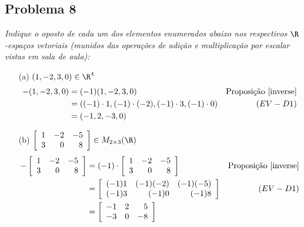 \subsection*{Problema 8}
  \textit{Indique  o oposto  de cada  um dos  elementos enumerados  abaixo nos
  respectivos $\R$-espaços vetoriais  (munidos das operações de adição
  e multiplicação por escalar vistas em sala de aula):}
\begin{itemize}
\item[(a)] $(1, -2, 3, 0 ) \in \R^4$
    \begin{align*}
      -(1, -2, 3, 0) &= (-1)(1, -2, 3, 0) & \text{Proposição \ref{inverse}} \\
      &= ((-1)\cdot 1, (-1)\cdot(-2), (-1)\cdot 3, (-1)\cdot0) & (EV - D1)\\
      &= (-1, 2, -3, 0)\\
    \end{align*}


\item[(b)] 
$
\left [
\begin{array}{rrr}
1 & -2 & -5\\
3 &   0 &   8 \\
\end{array}
\right ]
\in 
M_{2 \times 3}( \R )
$
    \begin{align*}
        -
        \left [
        \begin{array}{rrr}
            1 & -2 & -5\\
            3 & 0 & 8 \\
        \end{array}
        \right ]&= (-1)\cdot
        \left [
        \begin{array}{rrr}
            1 & -2 & -5\\
            3 & 0 & 8 \\
        \end{array}
        \right ] & \text{Proposição \ref{inverse}}
        \\ 
        &= \left [
        \begin{array}{rrr}
            (-1)1 & (-1)(-2) & (-1)(-5)\\
            (-1)3 & (-1)0 & (-1)8 \\
        \end{array}
        \right ] & (EV-D1)
        \\ 
        &= 
         \left [
        \begin{array}{rrr}
            -1 & 2 & 5\\
            -3 & 0 & -8 \\
        \end{array}
        \right ]
    \end{align*}


\end{itemize}
